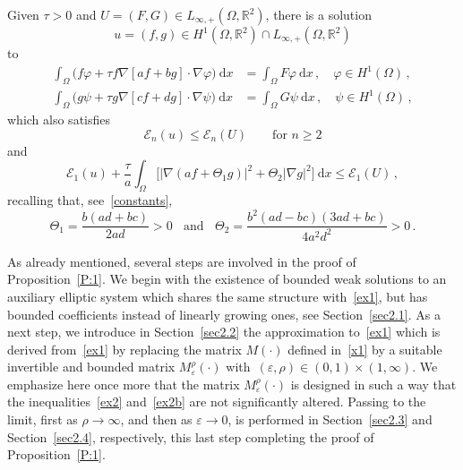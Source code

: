 \documentclass[10pt]{amsart}
\theoremstyle{definition}\newtheorem{defi}[theo]{Definition}\newtheorem{rema}[theo]{Remark}\newtheorem{exam}[theo]{Example}\newtheorem{exem}[theo]{Example}\newtheorem{nota}[theo]{Notation}
\newcommand{\bbR}{\mathbb{R}}
\newcommand{\clE}{\mathcal{E}}
\newcommand{\rmd}{\mathrm{d}}
\begin{document}
\begin{prop}\label{P:1}
Given $\tau>0$ and $U=(F,G)\in L_{\infty,+}(\Omega,\bbR^2)$, there is a solution
\begin{equation*}
u=(f,g) \in H^1\left(\Omega,\bbR^2\right)\cap L_{\infty,+}\left(\Omega,\bbR^2\right)
\end{equation*}
to
\begin{subequations}\label{ex1}
\begin{align}
\int_\Omega \big(f \varphi + \tau f \nabla\left[a f + b g \right] \cdot\nabla\varphi \big)\ \rmd x & = \int_\Omega F \varphi\ \rmd x\,, \quad \varphi\in H^1(\Omega)\,, \label{ex1a}
\\
\int_\Omega \big(g \psi + \tau g \nabla\left[c f +d g \right]\cdot \nabla\psi \big)\ \rmd x & = \int_\Omega G \psi\ \rmd x\,, \quad \psi\in H^1(\Omega)\,, \label{ex1b}
\end{align}
\end{subequations}
which also satisfies
\begin{equation}\label{ex2}
\clE_n(u) \le \clE_n(U)\qquad\text{for $n\ge 2$}
\end{equation}
and
\begin{equation}\label{ex2b}
\clE_1(u) + \frac{\tau}{a} \int_\Omega \big[|\nabla (af+\Theta_1 g)|^2 + \Theta_2|\nabla g|^2 \big]\ \rmd x \le \clE_1(U) \,, 
\end{equation}
recalling that, see~\eqref{constants},
\begin{equation*}
\Theta_1 = \frac{b(ad+bc)}{2ad}>0 \;\;\text{ and }\;\; \Theta_2 = \frac{b^2(ad-bc)(3ad+bc)}{4a^2 d^2}>0\,.
\end{equation*}
\end{prop}


As already mentioned, several steps are involved in the proof of Proposition~\ref{P:1}. We begin with the existence of bounded weak solutions to an auxiliary elliptic system which shares the same structure with~\eqref{ex1}, but has bounded coefficients instead of linearly growing ones, see Section~\ref{sec2.1}. As a next step, we introduce in Section~\ref{sec2.2} the approximation to~\eqref{ex1} which is derived from~\eqref{ex1} by replacing the matrix $M(\cdot)$ defined in~\eqref{x1} by a suitable invertible and bounded matrix $M_\varepsilon^\rho(\cdot)$ with~$(\varepsilon,\rho)\in (0,1)\times (1,\infty)$. We emphasize here once more that the matrix $M_\varepsilon^\rho(\cdot)$ is designed in such a way that the inequalities~\eqref{ex2} and~\eqref{ex2b} are not significantly altered. Passing to the limit, first as $\rho\to\infty$, and then as $\varepsilon\to 0$, is performed in Section~\ref{sec2.3} and Section~\ref{sec2.4}, respectively, this last step completing the proof of Proposition~\ref{P:1}.
\end{document}
